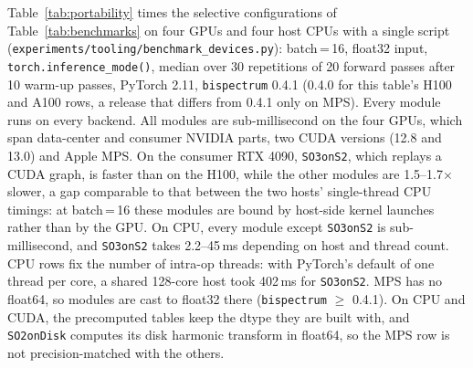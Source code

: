 \documentclass{article}
\theoremstyle{definition}
\theoremstyle{remark}
\theoremstyle{definition}
\begin{document}
Table~\ref{tab:portability} times the selective configurations of
Table~\ref{tab:benchmarks} on four GPUs and four host CPUs with a
single script (\texttt{experiments/tooling/benchmark\_devices.py}): batch\,=\,16, float32
input, \texttt{torch.inference\_mode()}, median over 30 repetitions of 20
forward passes after 10 warm-up passes, PyTorch 2.11, \texttt{bispectrum}
0.4.1 (0.4.0 for this table's H100 and A100 rows, a release that differs from 0.4.1 only on MPS).
Every module runs on every backend. All modules are sub-millisecond on the four
GPUs, which span data-center and consumer NVIDIA parts, two CUDA versions (12.8
and 13.0) and Apple MPS. On the consumer RTX 4090, \texttt{SO3onS2}, which
replays a CUDA graph, is faster than on the H100, while the other modules are
1.5--1.7$\times$ slower, a gap comparable to that between the two hosts'
single-thread CPU timings: at batch\,=\,16 these modules are bound by host-side
kernel launches rather than by the GPU. On CPU,
every module except \texttt{SO3onS2} is sub-millisecond, and \texttt{SO3onS2}
takes 2.2--45\,ms depending on host and thread count. CPU rows fix the number
of intra-op threads: with PyTorch's default of one thread per core, a shared
128-core host took 402\,ms for \texttt{SO3onS2}. MPS has no float64, so modules
are cast to float32 there (\texttt{bispectrum} $\geq$ 0.4.1). On CPU and CUDA, the
precomputed tables keep the dtype they are built with, and \texttt{SO2onDisk}
computes its disk harmonic transform in float64, so the MPS row is not
precision-matched with the others.
\end{document}
